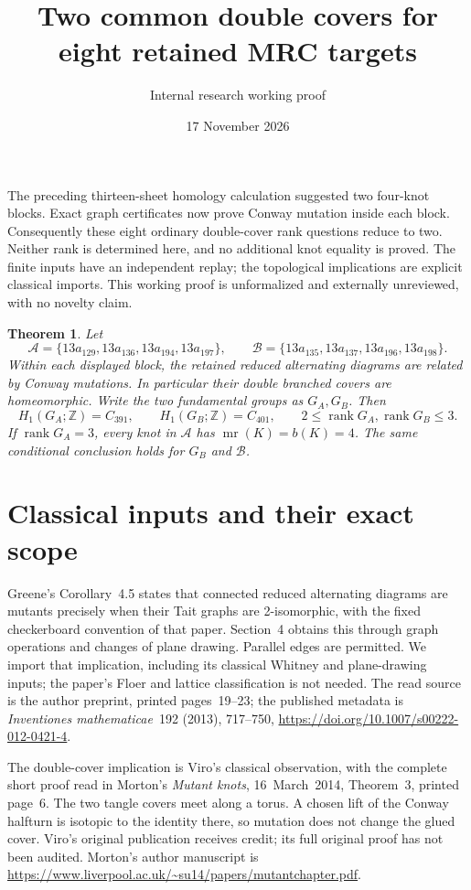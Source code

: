 \documentclass[11pt]{article}
\title{Two common double covers for eight retained MRC targets}
\author{Internal research working proof}
\date{17 November 2026}
\newtheorem{theorem}{Theorem}
\newcommand{\rank}{\operatorname{rank}}
\newcommand{\mr}{\operatorname{mr}}
\begin{document}
\maketitle

The preceding thirteen-sheet homology calculation suggested two four-knot
blocks. Exact graph certificates now prove Conway mutation inside each
block. Consequently these eight ordinary double-cover rank questions
reduce to two. Neither rank is determined here, and no additional knot
equality is proved. The finite inputs have an independent replay; the
topological implications are explicit classical imports. This working
proof is unformalized and externally unreviewed, with no novelty claim.

\begin{theorem}\label{thm:blocks}
Let
\[
 \mathcal A=\{13a_{129},13a_{136},13a_{194},13a_{197}\},\qquad
 \mathcal B=\{13a_{135},13a_{137},13a_{196},13a_{198}\}.
\]
Within each displayed block, the retained reduced alternating diagrams
are related by Conway mutations. In particular their double branched
covers are homeomorphic. Write the two fundamental groups as $G_A,G_B$.
Then
\[
 H_1(G_A;\mathbb Z)=C_{391},\qquad H_1(G_B;\mathbb Z)=C_{401},
 \qquad 2\le\rank G_A,\rank G_B\le3.
\]
If $\rank G_A=3$, every knot in $\mathcal A$ has $\mr(K)=b(K)=4$.
The same conditional conclusion holds for $G_B$ and $\mathcal B$.
\end{theorem}

\section{Classical inputs and their exact scope}

Greene's Corollary~4.5 states that connected reduced alternating
diagrams are mutants precisely when their Tait graphs are
2-isomorphic, with the fixed checkerboard convention of that paper.
Section~4 obtains this through graph operations and changes of plane
drawing. Parallel edges are permitted. We import that implication,
including its classical Whitney and plane-drawing inputs; the paper's
Floer and lattice classification is not needed. The read source is
the author preprint, printed pages~19--23; the published metadata is
\emph{Inventiones mathematicae}~192 (2013), 717--750,
\url{https://doi.org/10.1007/s00222-012-0421-4}.

The double-cover implication is Viro's classical observation, with
the complete short proof read in Morton's \emph{Mutant knots},
16~March~2014, Theorem~3, printed page~6. The two tangle covers
meet along a torus. A chosen lift of the Conway halfturn is isotopic
to the identity there, so mutation does not change the glued cover.
Viro's original publication receives credit; its full original proof
has not been audited. Morton's author manuscript is
\url{https://www.liverpool.ac.uk/~su14/papers/mutantchapter.pdf}.
\end{document}

